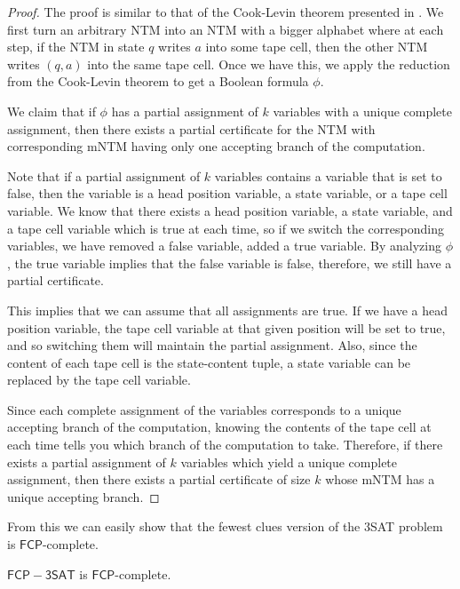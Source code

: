 \documentclass[runningheads,a4paper]{llncs}
\begin{document}
\begin{proof}
The proof is similar to that of the Cook-Levin theorem presented in \cite{Garey}. We first turn an arbitrary NTM into an NTM with a bigger alphabet where at each step, if the NTM in state $q$ writes $a$ into some tape cell, then the other NTM writes $(q,a)$ into the same tape cell. Once we have this, we apply the reduction from the Cook-Levin theorem to get a Boolean formula $\phi$. 

We claim that if $\phi$ has a partial assignment of $k$ variables with a unique complete assignment, then there exists a partial certificate for the NTM with corresponding mNTM having only one accepting branch of the computation.

Note that if a partial assignment of $k$ variables contains a variable that is set to false, then the variable is a head position variable, a state variable, or a tape cell variable. We know that there exists a head position variable, a state variable, and a tape cell variable which is true at each time, so if we switch the corresponding variables, we have removed a false variable, added a true variable. By analyzing $\phi$, the true variable implies that the false variable is false, therefore, we still have a partial certificate. 

This implies that we can assume that all assignments are true. If we have a head position variable, the tape cell variable at that given position will be set to true, and so switching them will maintain the partial assignment. Also, since the content of each tape cell is the state-content tuple, a state variable can be replaced by the tape cell variable.

Since each complete assignment of the variables corresponds to a unique accepting branch of the computation, knowing the contents of the tape cell at each time tells you which branch of the computation to take. Therefore, if there exists a partial assignment of $k$ variables which yield a unique complete assignment, then there exists a partial certificate of size $k$ whose mNTM has a unique accepting branch.
\end{proof}

From this we can easily show that the fewest clues version of the 3SAT problem is $\mathsf{FCP}$-complete.

\begin{theorem}
$\mathsf{FCP-3SAT}$ is $\mathsf{FCP}$-complete.
\end{theorem}
\end{document}
